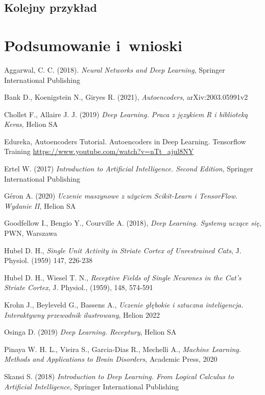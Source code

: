 \documentclass[12pt]{mwbk}
\theoremstyle{plain}
\theoremstyle{definition}
\theoremstyle{remark}
\begin{document}
\section{Kolejny przykład}


\chapter*{Podsumowanie i~wnioski}


\begin{thebibliography}{99}

 Aggarwal, C. C. (2018).\emph{ Neural Networks and Deep Learning}, Springer International Publishing

 Bank D., Koenigstein N., Giryes R. (2021), \emph{Autoencoders}, arXiv:2003.05991v2

 Chollet F., Allaire J. J. (2019) \emph{Deep Learning. Praca z językiem R i biblioteką Keras}, Helion SA

 Edureka, Autoencoders Tutorial. Autoencoders in Deep Learning. Tensorflow Training \url{https://www.youtube.com/watch?v=nTt_ajul8NY} 

 Ertel W. (2017) \emph{Introduction to Artificial Intelligence. Second Edition}, Springer International Publishing

 G\'eron A. (2020) \emph{Uczenie maszynowe z użyciem Scikit-Learn i TensorFlow. Wydanie II}, Helion SA

 Goodfellow I., Bengio Y., Courville A. (2018), \emph{Deep Learning. Systemy uczące się}, PWN, Warszawa 

 Hubel D. H., \emph{Single Unit Activity in  Striate Cortex of Unrestrained Cats}, J. Physiol. (1959) 147, 226-238

 Hubel D. H., Wiesel T. N., \emph{Receptive Fields of Single Neurones in the Cat's Striate Cortex}, J. Physiol., (1959), 148, 574-591

 Krohn J., Beyleveld G., Bassens A., \emph{Uczenie głębokie i sztuczna inteligencja. Interaktywny przewodnik ilustrowany}, Helion 2022

 Osinga D. (2019) \emph{Deep Learning. Receptury}, Helion SA

 Pinaya W. H. L., Vieira S., Garcia-Dias R., Mechelli A., \emph{Machine Learning. Methods and Applications to Brain Disorders}, Academic Press,
2020

 Skansi S. (2018) \emph{Introduction to Deep Learning. From Logical Calculus to Artificial Intelligence}, Springer International Publishing


\end{thebibliography}
\end{document}

